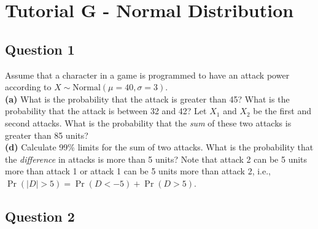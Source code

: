 \documentclass[]{article}
\begin{document}
\section{Tutorial G - Normal Distribution}
\subsection*{Question 1}
Assume that a character in a game is programmed to have an attack power according to $X \sim \text{Normal}(\mu=40,\sigma=3)$.\\[-0.2cm]

{\bf(a)} What is the probability that the attack is greater than 45?  What is the probability that the attack is between 32 and 42?  Let $X_1$ and $X_2$ be the first and second attacks. What is the probability that the \emph{sum} of these two attacks is greater than 85 units? \quad \\{\bf(d)} Calculate 99\% limits for the sum of two attacks.   What is the probability that the \emph{difference} in attacks is more than 5 units? Note that attack 2 can be 5 units more than attack 1 or attack 1 can be 5 units more than attack 2, i.e., $\Pr(|D|>5)=\Pr(D<-5) + \Pr(D>5)$.



\subsection*{Question 2}
\end{document}
